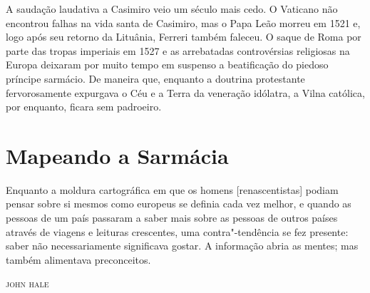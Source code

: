 A saudação laudativa a Casimiro veio um século mais cedo. O Vaticano não
encontrou falhas na vida santa de Casimiro, mas o Papa Leão  morreu em
1521 e, logo após seu retorno da Lituânia, Ferreri também faleceu. O
saque de Roma por parte das tropas imperiais em 1527 e as arrebatadas
controvérsias religiosas na Europa deixaram por muito tempo em suspenso
a beatificação do piedoso príncipe sarmácio. De maneira que, enquanto a
doutrina protestante fervorosamente expurgava o Céu e a Terra da
veneração idólatra, a Vilna católica, por enquanto, ficara sem
padroeiro.

%

\chapter{Mapeando a Sarmácia}

\epigraph{Enquanto a moldura cartográfica em que os homens {[}renascentistas{]}
podiam pensar sobre si mesmos como europeus se definia cada vez melhor,
e quando as pessoas de um país passaram a saber mais sobre as pessoas de
outros países através de viagens e leituras crescentes, uma
contra"-tendência se fez presente: saber não necessariamente significava
gostar. A informação abria as mentes; mas também alimentava
preconceitos.}{\textsc{john hale}}

